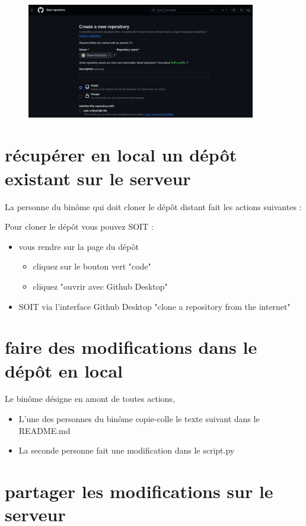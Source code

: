 \begin{figure}[H]

  \includegraphics[width=10cm]{images/depot_distant_crea2.png}
    \end{figure}

\section{récupérer en local un dépôt existant sur le serveur}
La personne du binôme qui doit cloner le dépôt distant fait les actions suivantes :


Pour cloner le dépôt vous pouvez SOIT :
\begin{itemize}
\item  vous rendre sur la page du dépôt
\begin{itemize}
\item cliquez sur le bouton vert "code" 
\item cliquez "ouvrir avec Github Desktop"
\end{itemize}

\item SOIT via l'interface  Github Desktop "clone a repository from the internet"
\end{itemize}


\section{faire des modifications dans le dépôt en local}

Le binôme désigne en amont de toutes actions,
\begin{itemize}
\item L'une des personnes du binôme copie-colle le texte suivant dans le README.md
\item La seconde personne fait une modification dans le script.py
\end{itemize}


\section{partager les modifications sur le serveur}

